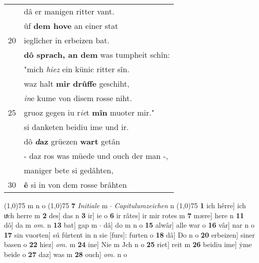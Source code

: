\documentclass[8pt,a4paper,notitlepage]{article}
\begin{document}
\begin{table}[ht]
\begin{minipage}[t]{0.5\linewidth}
\begin{tabular}{rl}
 & dâ er manigen ritter vant.\\ 
 & ûf \textbf{dem hove} an einer stat\\ 
20 & ieglîcher in erbeizen bat.\\ 
 & \textbf{dô sprach, an dem} was tumpheit schîn:\\ 
 & "mich \textit{hiez} ein künic ritter sîn.\\ 
 & waz halt \textbf{mir drûffe} geschiht,\\ 
 & \textit{in}e kume von disem rosse niht.\\ 
25 & gruoz gegen iu r\textit{ie}t \textbf{mîn} muoter mir."\\ 
 & si danketen beidiu ime und ir.\\ 
 & dô \textbf{\textit{d}az} grüezen \textbf{wart} getân\\ 
 & - daz ros was müede und ouch der man -,\\ 
 & maniger bete si gedâhten,\\ 
30 & \textbf{ê} si in von dem rosse brâhten\\ 
\end{tabular}
\scriptsize
\line(1,0){75} \newline
m n o \newline
\line(1,0){75} \newline
\textbf{7} \textit{Initiale} m   $\cdot$ \textit{Capitulumzeichen} n  \newline
\line(1,0){75} \newline
\textbf{1} ich hêrre] ich uͯch herre m \textbf{2} des] das n \textbf{3} ir] ie o \textbf{6} ir râtes] ir mir rotes m \textbf{7} mære] here n \textbf{11} dô] da m \textit{om.} n \textbf{13} bat] gap m  $\cdot$ dâ] do m n o \textbf{15} alwâr] alle war o \textbf{16} vâr] nar n o \textbf{17} sin vuorten] sú fúrtent in n sie [furs]: furten o \textbf{18} dâ] Do n o \textbf{20} erbeizen] siner basen o \textbf{22} hiez] \textit{om.} m \textbf{24} ine] Nie m Jch n o \textbf{25} riet] reit m \textbf{26} beidiu ime] ẏme beide o \textbf{27} daz] was m \textbf{28} ouch] \textit{om.} n o \newline
\end{minipage}
\end{table}
\newpage
\end{document}
